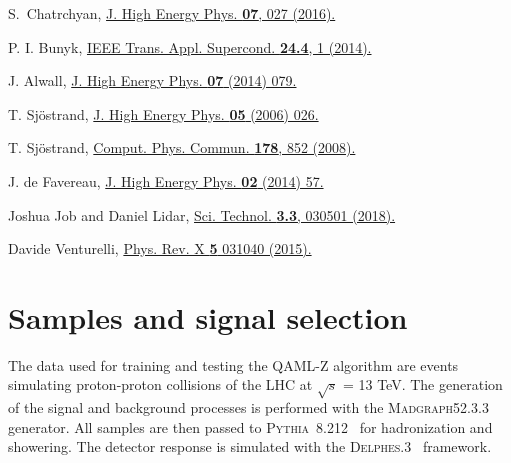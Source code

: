 \documentclass{article}
\begin{document}
\begin{thebibliography}{9}
  S.~Chatrchyan,
  \href{https://doi.org/10.1007/JHEP07(2016)027}
  {J. High Energy Phys. \textbf{07}, 027 (2016).}

  P. I. Bunyk,
  \href{https://doi.org/10.1109/TASC.2014.2318294}
  {IEEE Trans. Appl. Supercond. \textbf{24.4}, 1 (2014).}

  J. Alwall,
  \href{https://doi.org/10.1007/JHEP07(2014)079}
  {J. High Energy Phys. \textbf{07} (2014) 079.}

  T. Sj{\"o}strand, 
  \href{https://doi.org/10.1088/1126-6708/2006/05/026}
  {J. High Energy Phys. \textbf{05} (2006) 026.}

  T. Sj{\"o}strand,
  \href{https://doi.org/10.1016/j.cpc.2008.01.036}
  {Comput. Phys. Commun. \textbf{178}, 852 (2008).}

  J. de Favereau,
  \href{https://doi.org/10.1007/JHEP02(2014)057}
  {J. High Energy Phys. \textbf{02} (2014) 57.}

  Joshua Job and Daniel Lidar,
  \href{https://doi.org/10.1088/2058-9565/aabd9b}
  {Sci. Technol. \textbf{3.3}, 030501 (2018).}

  Davide Venturelli,
  \href{https://doi.org/10.1103/PhysRevX.5.031040}
  {Phys. Rev. X \textbf{5} 031040 (2015).}
  
\end{thebibliography}


\appendix

\section{Samples and signal selection}
\label{s:pb16}

The data used for training and testing the QAML-Z algorithm are events 
simulating proton-proton collisions of the LHC at $\sqrt{s}$ = 13 TeV. The 
generation of the signal and background processes is performed with the 
\textsc{Madgraph5}2.3.3~\cite{MG} generator. All samples are then passed 
to \textsc{Pythia}~8.212~\cite{Pythia1,Pythia2} for hadronization and 
showering. The detector response is simulated with the 
\textsc{Delphes}.3~\cite{DE} framework.
\end{document}
